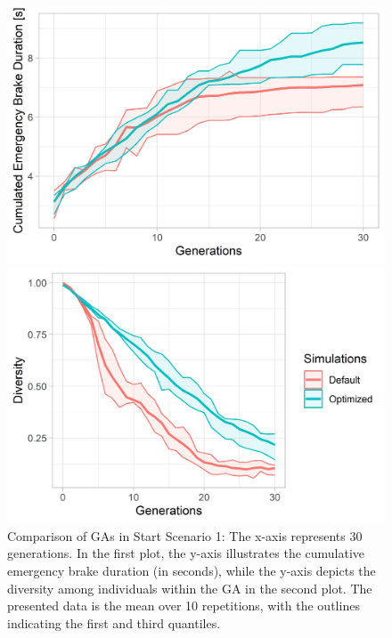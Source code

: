 \begin{figure}[ht] 
	\begin{minipage}[b]{0.5\linewidth}
		\centering
		\includegraphics[width=1\linewidth]{simulations/evaluation/plots/sim_1_ga_generations} 
	\end{minipage}%
	\begin{minipage}[b]{0.5\linewidth}
		\centering
		\includegraphics[width=1\linewidth]{simulations/evaluation/plots/sim_1_ga_diversity} 
	\end{minipage} 
	\caption{Comparison of GAs in Start Scenario 1: The x-axis represents 30 generations. In the first plot, the y-axis illustrates the cumulative emergency brake duration (in seconds), while the y-axis depicts the diversity among individuals within the GA in the second plot. The presented data is the mean over 10 repetitions, with the outlines indicating the first and third quantiles.}
	\label{fig:evaluation:sim_1_ga_comparison}
\end{figure}

